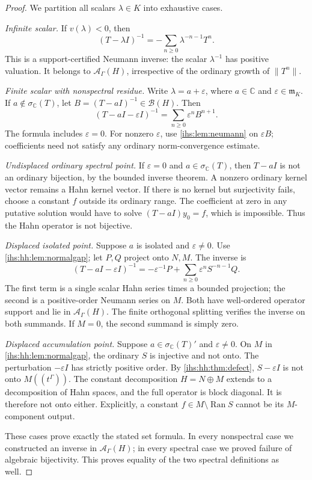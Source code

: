 \documentclass[11pt,a4paper]{article}
\numberwithin{equation}{section}
\theoremstyle{definition}
\theoremstyle{remark}
\newcommand{\C}{\mathbb C}
\newcommand{\K}{K}
\newcommand{\mK}{\mathfrak m_K}
\newcommand{\B}{\mathcal B(H)}
\newcommand{\Ahh}{\mathcal A_\Gamma(H)}
\newcommand{\Ran}{\operatorname{Ran}}
\newcommand{\eps}{\varepsilon}
\newcommand{\norm}[1]{\lVert#1\rVert}
\begin{document}
\begin{proof}
We partition all scalars $\lambda\in\K$ into exhaustive cases.

\emph{Infinite scalar.} If $v(\lambda)<0$, then
\begin{equation}\label{ihs:hh:eq:infiniteres}
 (T-\lambda I)^{-1}=-\sum_{n\ge0}\lambda^{-n-1}T^n.
\end{equation}
This is a support-certified Neumann inverse: the scalar $\lambda^{-1}$ has
positive valuation. It belongs to $\Ahh$, irrespective of the ordinary
growth of $\norm{T^n}$.

\emph{Finite scalar with nonspectral residue.} Write $\lambda=a+\eps$, where
$a\in\C$ and $\eps\in\mK$. If $a\notin\sigma_\C(T)$, let
$B=(T-aI)^{-1}\in\B$. Then
\begin{equation}\label{ihs:hh:eq:regularres}
 (T-aI-\eps I)^{-1}=\sum_{n\ge0}\eps^n B^{n+1}.
\end{equation}
The formula includes $\eps=0$. For nonzero $\eps$, use
\cref{ihs:lem:neumann} on $\eps B$; coefficients need not satisfy any
ordinary norm-convergence estimate.

\emph{Undisplaced ordinary spectral point.} If $\eps=0$ and
$a\in\sigma_\C(T)$, then $T-aI$ is not an ordinary bijection, by the bounded
inverse theorem. A nonzero ordinary kernel vector remains a Hahn kernel
vector. If there is no kernel but surjectivity fails, choose a constant $f$
outside its ordinary range. The coefficient at zero in any putative solution
would have to solve $(T-aI)y_0=f$, which is impossible. Thus the Hahn
operator is not bijective.

\emph{Displaced isolated point.} Suppose $a$ is isolated and $\eps\ne0$. Use
\cref{ihs:hh:lem:normalgap}; let $P,Q$ project onto $N,M$. The inverse is
\begin{equation}\label{ihs:hh:eq:isolatedres}
 (T-aI-\eps I)^{-1}=-\eps^{-1}P+\sum_{n\ge0}\eps^n S^{-n-1}Q.
\end{equation}
The first term is a single scalar Hahn series times a bounded projection;
the second is a positive-order Neumann series on $M$. Both have well-ordered
operator support and lie in $\Ahh$. The finite orthogonal splitting verifies
the inverse on both summands. If $M=0$, the second summand is simply zero.

\emph{Displaced accumulation point.} Suppose $a\in\sigma_\C(T)'$ and
$\eps\ne0$. On $M$ in \cref{ihs:hh:lem:normalgap}, the ordinary $S$ is
injective and not onto. The perturbation $-\eps I$ has strictly positive
order. By \cref{ihs:hh:thm:defect}, $S-\eps I$ is not onto
$M((t^\Gamma))$. The constant decomposition $H=N\oplus M$ extends to a
decomposition of Hahn spaces, and the full operator is block diagonal. It is
therefore not onto either. Explicitly, a constant $f\in M\setminus\Ran S$
cannot be its $M$-component output.

These cases prove exactly the stated set formula. In every nonspectral case
we constructed an inverse in $\Ahh$; in every spectral case we proved
failure of algebraic bijectivity. This proves equality of the two spectral
definitions as well.
\end{proof}
\end{document}
